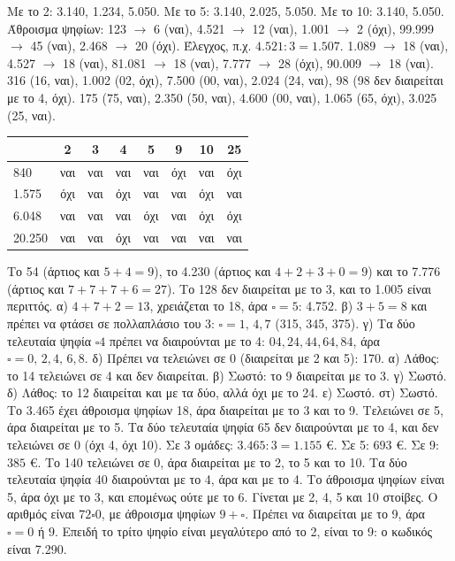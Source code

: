  Με το 2: 3.140, 1.234, 5.050. Με το 5: 3.140, 2.025, 5.050. Με το 10: 3.140, 5.050.
 Άθροισμα ψηφίων: 123 $\to$ 6 (ναι), 4.521 $\to$ 12 (ναι), 1.001 $\to$ 2 (όχι), 99.999 $\to$ 45 (ναι), 2.468 $\to$ 20 (όχι). Έλεγχος, π.χ. $4.521:3=1.507$.
 1.089 $\to$ 18 (ναι), 4.527 $\to$ 18 (ναι), 81.081 $\to$ 18 (ναι), 7.777 $\to$ 28 (όχι), 90.009 $\to$ 18 (ναι).
 316 (16, ναι), 1.002 (02, όχι), 7.500 (00, ναι), 2.024 (24, ναι), 98 (98 δεν διαιρείται με το 4, όχι).
 175 (75, ναι), 2.350 (50, ναι), 4.600 (00, ναι), 1.065 (65, όχι), 3.025 (25, ναι).
 \begin{tabular}[t]{@{}lccccccc@{}}\toprule & 2 & 3 & 4 & 5 & 9 & 10 & 25\\\midrule 840 & ναι & ναι & ναι & ναι & όχι & ναι & όχι\\ 1.575 & όχι & ναι & όχι & ναι & ναι & όχι & ναι\\ 6.048 & ναι & ναι & ναι & όχι & ναι & όχι & όχι\\ 20.250 & ναι & ναι & όχι & ναι & ναι & ναι & ναι\\\bottomrule\end{tabular}
 Το 54 (άρτιος και $5+4=9$), το 4.230 (άρτιος και $4+2+3+0=9$) και το 7.776 (άρτιος και $7+7+7+6=27$). Το 128 δεν διαιρείται με το 3, και το 1.005 είναι περιττός.
 α) $4+7+2=13$, χρειάζεται το 18, άρα $\square=5$: 4.752. \quad β) $3+5=8$ και πρέπει να φτάσει σε πολλαπλάσιο του 3: $\square=1,\,4,7$ (315, 345, 375). \quad γ) Τα δύο τελευταία ψηφία $\square 4$ πρέπει να διαιρούνται με το 4: $04, 24, 44, 64, 84$, άρα $\square=0,\,2,4,\,6,8$. \quad δ) Πρέπει να τελειώνει σε 0 (διαιρείται με 2 και 5): 170.
 α) Λάθος: το 14 τελειώνει σε 4 και δεν διαιρείται. β) Σωστό: το 9 διαιρείται με το 3. γ) Σωστό. δ) Λάθος: το 12 διαιρείται και με τα δύο, αλλά όχι με το 24. ε) Σωστό. στ) Σωστό.
 Το 3.465 έχει άθροισμα ψηφίων 18, άρα διαιρείται με το 3 και το 9. Τελειώνει σε 5, άρα διαιρείται με το 5. Τα δύο τελευταία ψηφία 65 δεν διαιρούνται με το 4, και δεν τελειώνει σε 0 (όχι 4, όχι 10). Σε 3 ομάδες: $3.465:3=1.155$ €. Σε 5: $693$ €. Σε 9: $385$ €.
 Το 140 τελειώνει σε 0, άρα διαιρείται με το 2, το 5 και το 10. Τα δύο τελευταία ψηφία 40 διαιρούνται με το 4, άρα και με το 4. Το άθροισμα ψηφίων είναι 5, άρα όχι με το 3, και επομένως ούτε με το 6. Γίνεται με 2, 4, 5 και 10 στοίβες.
 Ο αριθμός είναι $72\square 0$, με άθροισμα ψηφίων $9+\square$. Πρέπει να διαιρείται με το 9, άρα $\square=0$ ή $9$. Επειδή το τρίτο ψηφίο είναι μεγαλύτερο από το 2, είναι το 9: ο κωδικός είναι 7.290.
